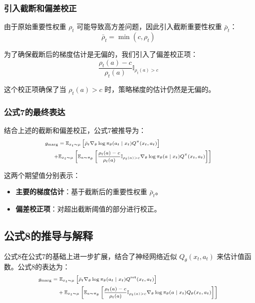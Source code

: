 \documentclass[twocolumn, 10pt]{article} %
\theoremstyle{remark}
\begin{document}
\subsubsection{引入截断和偏差校正}

由于原始重要性权重 \( \rho_t \) 可能导致高方差问题，因此引入截断重要性权重 \( \bar{\rho}_t \)：
\[
\bar{\rho}_t = \min(c, \rho_t)
\]

为了确保截断后的梯度估计是无偏的，我们引入了偏差校正项：
\[
\frac{\rho_t(a) - c}{\rho_t(a)} \mathbb{I}_{\rho_t(a) > c}
\]

这个校正项确保了当 \( \rho_t(a) > c \) 时，策略梯度的估计仍然是无偏的。

\subsubsection{公式7的最终表达}

结合上述的截断和偏差校正，公式7被推导为：
\[
\scriptsize
\begin{aligned}
g_{\text{marg}} &= \mathbb{E}_{x_t \sim \mu} \left[ \bar{\rho}_t \nabla_\theta \log \pi_\theta(a_t \mid x_t) Q^\pi(x_t, a_t) \right] \\
 + &\mathbb{E}_{x_t \sim \mu} \left[ \mathbb{E}_{a \sim \pi_\theta} \left[ \frac{\rho_t(a) - c}{\rho_t(a)} \mathbb{I}_{\rho_t(a) > c} \nabla_\theta \log \pi_\theta(a \mid x_t) Q^\pi(x_t, a_t) \right] \right]
\end{aligned}
\]

这两个期望值分别表示：
\begin{itemize}
    \item \textbf{主要的梯度估计}：基于截断后的重要性权重 \( \bar{\rho}_t \)。
    \item \textbf{偏差校正项}：对超出截断阈值的部分进行校正。
\end{itemize}

\subsection{公式8的推导与解释}

公式8在公式7的基础上进一步扩展，结合了神经网络近似 \( Q_\theta(x_t, a_t) \) 来估计值函数。公式8的表达为：
\[
\scriptsize
\begin{aligned}
g_{\text{marg}} = &\ \mathbb{E}_{x_t \sim \mu} \left[ \bar{\rho}_t \nabla_\theta \log \pi_\theta(a_t \mid x_t) Q^{\text{ret}}(x_t, a_t) \right] \\
&+ \mathbb{E}_{x_t \sim \mu} \left[ \mathbb{E}_{a \sim \pi_\theta} \left[ \frac{\rho_t(a) - c}{\rho_t(a)} \mathbb{I}_{\rho_t(a) > c} \nabla_\theta \log \pi_\theta(a \mid x_t) Q_\theta(x_t, a_t) \right] \right]
\end{aligned}
\]
\end{document}

